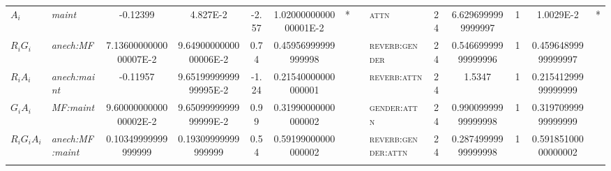\begin{table}
\begin{tabular}{ l >{\itshape}l S S S S[round-precision=3,round-minimum=0.001,table-format=>1.3] c c >{\scshape}l c S c S[round-precision=3,round-minimum=0.001,table-format=>1.3] c@{} }
	$A_i$             & maint                 & -0.12399                & 4.827E-2               & -2.57                        & 1.0200000000000001E-2   & *       & & attn                                      & 24                  & 6.6296999999999997                                & 1                  & 1.0029E-2                                         & *                    \\ 
	$R_i G_i$         & anech:MF              & 7.1360000000000007E-2   & 9.6490000000000006E-2  & 0.74                         & 0.45956999999999998     &         & & reverb:gender                             & 24                  & 0.54669999999999996                               & 1                  & 0.45964899999999997                               &                      \\ 
	$R_i A_i$         & anech:maint           & -0.11957                & 9.6519999999999995E-2  & -1.24                        & 0.21540000000000001     &         & & reverb:attn                               & 24                  & 1.5347                                            & 1                  & 0.21541299999999999                               &                      \\ 
	$G_i A_i$         & MF:maint              & 9.6000000000000002E-2   & 9.6509999999999999E-2  & 0.99                         & 0.31990000000000002     &         & & gender:attn                               & 24                  & 0.99009999999999998                               & 1                  & 0.31970999999999999                               &                      \\ 
	$R_i G_i A_i$     & anech:MF:maint        & 0.10349999999999999     & 0.19309999999999999    & 0.54                         & 0.59199000000000002     &         & & reverb:gender:attn                        & 24                  & 0.28749999999999998                               & 1                  & 0.59185100000000002                               &                      \\ \midrule
	 &                 &                        &                              &                         &         & &                                           &                     &                                                   &                    &                                                   &                      \\

\end{tabular}
\end{table}
